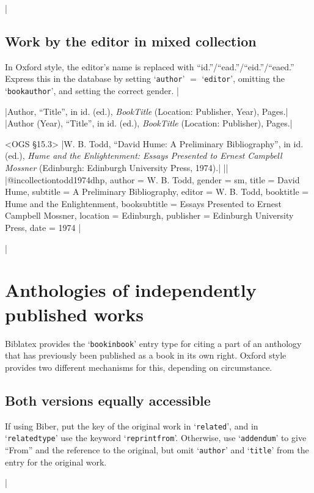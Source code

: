 \documentclass[extrafontsizes,11pt,a4paper,oneside]{memoir}
\newcommand*{\lit}[1]{\textsf{#1}}
\newcommand*{\code}[1]{`\texttt{#1}'}
\begin{document}
\todoc|
\subsection{Work by the editor in mixed collection}

In Oxford style, the editor's name is replaced with \enquote{id.}\slash \enquote{ead.}\slash \enquote{eid.}\slash \enquote{eaed.} Express this in the database by setting \code{author} $=$ \code{editor}, omitting the \code{bookauthor}, and setting the correct gender.
|

\specs
|Author, \enquote{Title}, \lit{in id.} (\lit{ed.}), \emph{BookTitle} (Location: Publisher, Year), Pages.|%
|Author (Year), \enquote{Title}, \lit{in id.} (\lit{ed.}), \emph{BookTitle} (Location: Publisher), Pages.|

\bibexample<OGS \S15.3>
|W. B. Todd, \enquote{David Hume: A Preliminary Bibliography}, in id. (ed.), \emph{Hume and the Enlightenment: Essays Presented to Ernest Campbell Mossner} (Edinburgh: Edinburgh University Press, 1974).|%
||%
|@incollection{todd1974dhp,
  author = {W. B. Todd},
  gender = {sm},
  title = {David Hume},
  subtitle = {A Preliminary Bibliography},
  editor = {W. B. Todd},
  booktitle = {Hume and the Enlightenment},
  booksubtitle = {Essays Presented to Ernest Campbell Mossner},
  location = {Edinburgh},
  publisher = {Edinburgh University Press},
  date = {1974}
}|

\todoc|
\section{Anthologies of independently published works}

Biblatex provides the \code{bookinbook} entry type for citing a part of an anthology that has previously been published as a book in its own right. Oxford style provides two different mechanisms for this, depending on circumstance.

\subsection{Both versions equally accessible}

If using Biber, put the key of the original work in \code{related}, and in \code{relatedtype} use the keyword \code{reprintfrom}. Otherwise, use \code{addendum} to give \enquote{From} and the reference to the original, but omit \code{author} and \code{title} from the entry for the original work.

|
\end{document}
